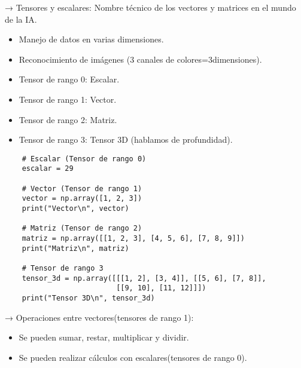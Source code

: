 \documentclass{templateNote}
\begin{document}
 → Tensores y escalares: Nombre técnico de los vectores y matrices en el mundo de la IA. 
\begin{itemize}
    \item Manejo de datos en varias dimensiones.
    \item Reconocimiento de imágenes (3 canales de colores=3dimensiones).
    \item Tensor de rango 0: Escalar.
    \item Tensor de rango 1: Vector.
    \item Tensor de rango 2: Matriz.
    \item Tensor de rango 3: Tensor 3D (hablamos de profundidad).
\end{itemize}
\begin{lstlisting}
    # Escalar (Tensor de rango 0)
    escalar = 29

    # Vector (Tensor de rango 1)
    vector = np.array([1, 2, 3])
    print("Vector\n", vector)

    # Matriz (Tensor de rango 2)
    matriz = np.array([[1, 2, 3], [4, 5, 6], [7, 8, 9]])
    print("Matriz\n", matriz)

    # Tensor de rango 3
    tensor_3d = np.array([[[1, 2], [3, 4]], [[5, 6], [7, 8]], 
                          [[9, 10], [11, 12]]])
    print("Tensor 3D\n", tensor_3d)
\end{lstlisting}

 → Operaciones entre vectores(tensores de rango 1):
\begin{itemize}
    \item Se pueden sumar, restar, multiplicar y dividir.
    \item Se pueden realizar cálculos con escalares(tensores de rango 0).
\end{itemize} 
\end{document}
